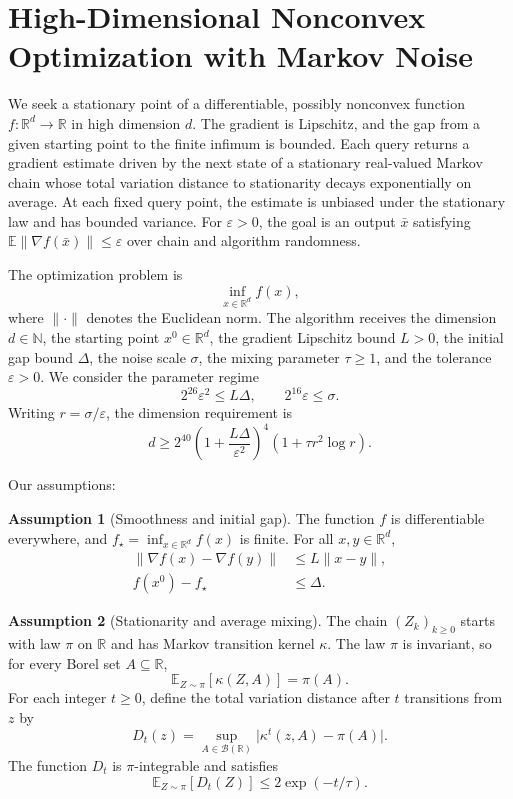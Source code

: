 \documentclass[10pt]{article}
\theoremstyle{definition}
\newtheorem{assumption}{Assumption}
\begin{document}
\section*{High-Dimensional Nonconvex Optimization with Markov Noise}
We seek a stationary point of a differentiable, possibly nonconvex function $f:\mathbb{R}^d\to\mathbb{R}$ in high dimension $d$. The gradient is Lipschitz, and the gap from a given starting point to the finite infimum is bounded. Each query returns a gradient estimate driven by the next state of a stationary real-valued Markov chain whose total variation distance to stationarity decays exponentially on average. At each fixed query point, the estimate is unbiased under the stationary law and has bounded variance. For $\varepsilon>0$, the goal is an output $\bar{x}$ satisfying $\mathbb{E}\|\nabla f(\bar{x})\|\leq\varepsilon$ over chain and algorithm randomness.

The optimization problem is
\[
\inf_{x\in\mathbb{R}^d} f(x),
\]
where $\|\cdot\|$ denotes the Euclidean norm. The algorithm receives the dimension $d\in\mathbb{N}$, the starting point $x^0\in\mathbb{R}^d$, the gradient Lipschitz bound $L>0$, the initial gap bound $\Delta$, the noise scale $\sigma$, the mixing parameter $\tau\geq 1$, and the tolerance $\varepsilon>0$. We consider the parameter regime
\[
2^{26}\varepsilon^2\leq L\Delta,
\qquad 2^{16}\varepsilon\leq\sigma.
\]
Writing $r=\sigma/\varepsilon$, the dimension requirement is
\[
d\geq 2^{40}\left(1+\frac{L\Delta}{\varepsilon^2}\right)^4
\left(1+\tau r^2\log r\right).
\]

Our assumptions:
\begin{assumption}[Smoothness and initial gap]
The function $f$ is differentiable everywhere, and $f_\star=\inf_{x\in\mathbb{R}^d}f(x)$ is finite. For all $x,y\in\mathbb{R}^d$,
\[
\begin{aligned}
\|\nabla f(x)-\nabla f(y)\|&\leq L\|x-y\|,\\
f(x^0)-f_\star&\leq\Delta.
\end{aligned}
\]
\end{assumption}

\begin{assumption}[Stationarity and average mixing]
The chain $(Z_k)_{k\geq 0}$ starts with law $\pi$ on $\mathbb{R}$ and has Markov transition kernel $\kappa$. The law $\pi$ is invariant, so for every Borel set $A\subseteq\mathbb{R}$,
\[
\mathbb{E}_{Z\sim\pi}[\kappa(Z,A)]=\pi(A).
\]
For each integer $t\geq 0$, define the total variation distance after $t$ transitions from $z$ by
\[
D_t(z)=\sup_{A\in\mathcal{B}(\mathbb{R})}
\bigl|\kappa^t(z,A)-\pi(A)\bigr|.
\]
The function $D_t$ is $\pi$-integrable and satisfies
\[
\mathbb{E}_{Z\sim\pi}[D_t(Z)]\leq 2\exp(-t/\tau).
\]
\end{assumption}
\end{document}
